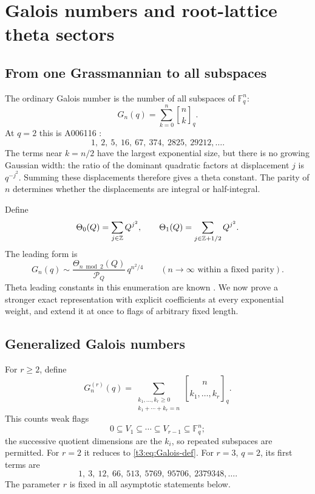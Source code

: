 \documentclass[11pt,openany]{book}
\numberwithin{equation}{chapter}
\theoremstyle{plain}
\theoremstyle{definition}
\theoremstyle{remark}
\newcommand{\F}{\mathbb F}
\newcommand{\qbinq}[2]{\genfrac{[}{]}{0pt}{}{#1}{#2}_{q}}   %
\newcommand{\Pinf}{\mathcal P_Q}
\newcommand{\T}{\Theta}
\begin{document}
\chapter{Galois numbers and root-lattice theta sectors}
\label{ct:ch:galois}

\label{t3:sec:galois}

\section{From one Grassmannian to all subspaces}

The ordinary Galois number is the number of all subspaces of $\F_q^n$:
\begin{equation}\label{t3:eq:Galois-def}
 G_n(q)=\sum_{k=0}^n\qbinq{n}{k}.
\end{equation}
At $q=2$ this is A006116 \cite{oeisGalois}:
\[
 1,\ 2,\ 5,\ 16,\ 67,\ 374,\ 2825,\ 29212,\ldots.
\]
The terms near $k=n/2$ have the largest exponential size, but there is no growing Gaussian width: the ratio of the dominant quadratic factors at displacement $j$ is $q^{-j^2}$. Summing these displacements therefore gives a theta constant. The parity of $n$ determines whether the displacements are integral or half-integral.

Define
\begin{equation}\label{t3:eq:theta2}
 \T_0(Q)=\sum_{j\in\Z}Q^{j^2},\qquad
 \T_1(Q)=\sum_{j\in\Z+1/2}Q^{j^2}.
\end{equation}
The leading form is
\begin{equation}\label{t3:eq:Galois-leading}
 G_n(q)\sim\frac{\T_{n\bmod2}(Q)}{\Pinf}\,q^{n^2/4}
 \qquad(n\to\infty\text{ within a fixed parity}).
\end{equation}
Theta leading constants in this enumeration are known \cite{kousidis}. We now prove a stronger exact representation with explicit coefficients at every exponential weight, and extend it at once to flags of arbitrary fixed length.

\section{Generalized Galois numbers}

For $r\ge2$, define
\begin{equation}\label{t3:eq:generalGalois-def}
 G_n^{(r)}(q)=\sum_{\substack{k_1,\ldots,k_r\ge0\\k_1+\cdots+k_r=n}}
 \genfrac{[}{]}{0pt}{}{n}{k_1,\ldots,k_r}_q.
\end{equation}
This counts weak flags
\[
 0\subseteq V_1\subseteq\cdots\subseteq V_{r-1}\subseteq\F_q^n;
\]
the successive quotient dimensions are the $k_i$, so repeated subspaces are permitted. For $r=2$ it reduces to \eqref{t3:eq:Galois-def}. For $r=3$, $q=2$, its first terms are
\[
 1,\ 3,\ 12,\ 66,\ 513,\ 5769,\ 95706,\ 2379348,\ldots.
\]
The parameter $r$ is fixed in all asymptotic statements below.
\end{document}
